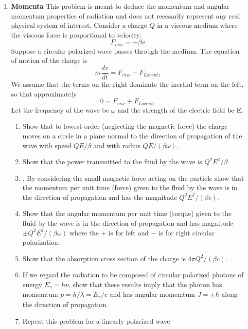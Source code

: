 \documentclass{article}
\begin{document}
\begin{enumerate}
\item{\bf Momenta}
This problem is meant to deduce the momentum and angular momentum
properties of radiation and does not recesarily represent any real
physical system of interest. Consider a charge $Q$ in a viscous medium
where the viscous force is proportional to velocity: 
\begin{equation}
F_{visc} = -\beta v
\end{equation}
Suppose a circular polarized wave passes through the medium. The
equation of motion of the charge is 
\begin{equation}
m \frac{dv}{dt} = F_{visc} + F_{Lorentz}
\end{equation}
We assume that the terms on the right dominate the inertial term on the
left, so that approximately 
\begin{equation}
0 = F_{visc} + F_{Lorentz}
\end{equation}
Let the frequency of the wave be $\omega$ and the strength of the
electric field be E.
\begin{enumerate}
\item Show that to lowest order (neglecting the magnetic force) the charge
   moves on a circle in a plane normal to the direction of propagation of
   the wave with speed $QE/\beta$ and with radius $QE/(\beta \omega)$.
\item Show that the power transmitted to the fliud by the wave is $Q^2 E^2/\beta$
\item. By considering the small magnetic force acting on the particle show
   that the momentum per unit time (force) given to the fluid by the wave
   is in the direction of propagation and has the magnitude 
   $Q^2 E^2/(\beta c)$.
\item Show that the angular momentum per unit time (torque) given to the
   fluid by the wave is in the direction of propagation and has magnitude
   $\pm Q^2 E^2/(\beta \omega)$ where the $+$ is for left and $-$ is for
   right circular polarization.
\item Show that the absorption cross section of the charge is
   $4\pi Q^2/(\beta c)$.
\item  If we regard the radiation to be composed of circular polarized
   photons of energy $E_\gamma= h \nu$, show that these results imply that the
   photon has momemtum $p=h/\lambda=E_\gamma/c$ and has angular momemtum 
   $J=\pm \hbar$ along the direction of propagation.
\item Repeat this problem for a linearly polarized wave
\end{enumerate}


\end{enumerate}
\end{document}
